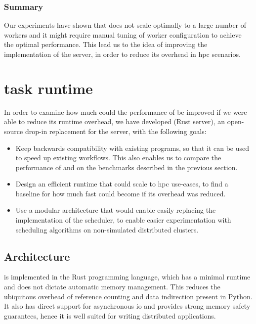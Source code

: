 \subsubsection*{Summary}
Our experiments have shown that \dask{} does not scale optimally to a large
number of workers and it might require manual tuning of worker configuration to achieve the optimal
performance. This lead us to the idea of improving the implementation of the
\dask{} server, in order to reduce its overhead in \gls{hpc}
scenarios.

\section{\rsds{} task runtime}
\label{sec:rsds-description}
In order to examine how much could the performance of \dask{} be improved if we
were able to reduce its runtime overhead, we have developed \rsds{} (Rust \dask{} server), an
open-source drop-in replacement for the \dask{}
server, with the following goals:

\begin{itemize}
	\item Keep backwards compatibility with existing \dask{} programs, so that it can be
	      used to speed up existing workflows. This also enables us to compare the performance of
	      \rsds{} and \dask{} on the benchmarks described in the
	      previous section.
	\item Design an efficient runtime that could scale to \gls{hpc} use-cases, to find a
	      baseline for how much fast could \dask{} become if its overhead was reduced.
	\item Use a modular architecture that would enable easily replacing the implementation of the scheduler,
	      to enable easier experimentation with scheduling algorithms on non-simulated distributed clusters.
\end{itemize}

\subsection*{Architecture}
\rsds{} is implemented in the Rust programming language, which has a minimal
runtime and does not dictate automatic memory management. This reduces the ubiquitous overhead of
reference counting and data indirection present in Python. It also has direct support for
asynchronous \gls{io} and provides strong memory safety guarantees, hence it is
well suited for writing distributed applications.

